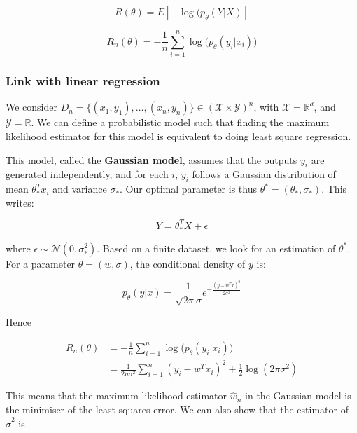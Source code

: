 \documentclass[
10pt, %
a4paper, %
oneside, %
headinclude,footinclude, %
BCOR5mm, %
]{scrartcl}
\begin{document}
\begin{equation}
    R(\theta) = E[-\log(p_{\theta}(Y|X)]
\end{equation}

\begin{equation}
    R_n(\theta) = - \frac{1}{n} \sum^{n}_{i=1} \log\big(p_{\theta}(y_i|x_i)\big)
\end{equation}

\subsubsection{\large\color{Periwinkle}Link with linear regression}

We consider $D_n = \{(x_1, y_1), \dots, (x_n, y_n)\}\in (\mathcal{X}\times \mathcal{Y})^n$, with $ \mathcal{X} = \mathbb{R}^d$, and $ \mathcal{Y} = \mathbb{R} $. We can define a probabilistic model such that finding the maximum likelihood estimator for this model is equivalent to doing least square regression.

This model, called the \textbf{{Gaussian model}}, assumes that the outputs $y_i$ are generated independently, and for each $i$, $y_i$ follows a Gaussian distribution of mean $\theta_*^Tx_i$ and variance $\sigma_*$. Our optimal parameter is thus $\theta^* =(\theta_*, \sigma_*)$. This writes:

\begin{equation*}
    Y = \theta_*^TX+\epsilon
\end{equation*}

where $\epsilon\sim \mathcal{N}(0, \sigma_*^2)$. Based on a finite dataset, we look for an estimation of $\theta^*$. For a parameter $\theta=(w, \sigma)$, the conditional density of $y$ is:

\begin{equation}
    p_{\theta}(y|x) = \frac{1}{ \sqrt{2\pi} \sigma} e^{- \frac{(y-w^Tx)^2}{2\sigma^2} }
\end{equation}

Hence 

\begin{equation}
    \begin{aligned}
	R_n(\theta) &= - \frac{1}{n} \sum^{n}_{i=1} \log\big(p_{\theta}(y_i|x_i)\big)\\
	&= \frac{1}{2n\sigma^2} \sum^{n}_{i=1} (y_i-w^Tx_i)^2+ \frac{1}{2} \log(2\pi \sigma^2)
    \end{aligned}
\end{equation}

This means that the maximum likelihood estimator $ \hat{w}_n$ in the Gaussian model is the minimiser of the least squares error. We can also show that the estimator of $ \hat{\sigma}^2$ is
\end{document}
